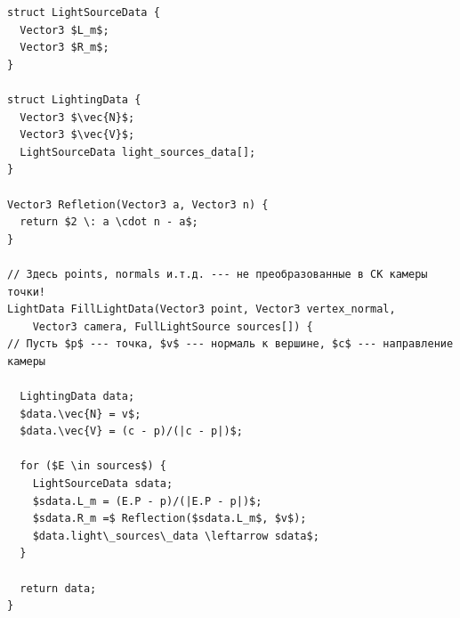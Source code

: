 \documentclass[a4paper,12pt]{report}
\numberwithin{equation}{section}
\begin{document}
\begin{lstlisting}[float=p,caption={Нахождение векторов для освещения по Фонгу},label=lighting_vectors_algo]
struct LightSourceData {
  Vector3 $L_m$;
  Vector3 $R_m$;
}

struct LightingData {
  Vector3 $\vec{N}$;
  Vector3 $\vec{V}$;
  LightSourceData light_sources_data[];
}

Vector3 Refletion(Vector3 a, Vector3 n) {
  return $2 \: a \cdot n - a$;
}

// Здесь points, normals и.т.д. --- не преобразованные в СК камеры точки!
LightData FillLightData(Vector3 point, Vector3 vertex_normal,
    Vector3 camera, FullLightSource sources[]) {
// Пусть $p$ --- точка, $v$ --- нормаль к вершине, $c$ --- направление камеры

  LightingData data;
  $data.\vec{N} = v$;
  $data.\vec{V} = (c - p)/(|c - p|)$;
  
  for ($E \in sources$) {
    LightSourceData sdata;
    $sdata.L_m = (E.P - p)/(|E.P - p|)$;
    $sdata.R_m =$ Reflection($sdata.L_m$, $v$);
    $data.light\_sources\_data \leftarrow sdata$;
  }
  
  return data;
}
\end{lstlisting}
\end{document}
